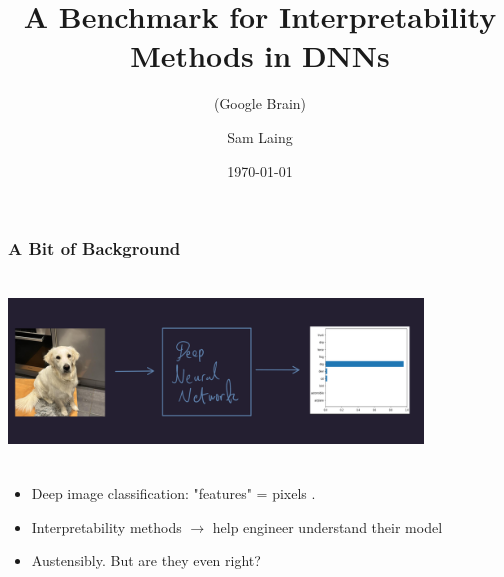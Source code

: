 \documentclass{beamer}
\theoremstyle{mystyle}
\begin{document}
\title{A Benchmark for Interpretability Methods in DNNs}
\subtitle{(Google Brain)}
\author{Sam Laing }
\date{\today}
\begin{frame}
\titlepage
\end{frame}
\begin{frame}
	\frametitle{A Bit of Background}
	\includegraphics[width = 11cm, height = 5cm]{dog_net2.png} \pause
	\begin{itemize}
		\item Deep image classification: "features" = pixels .\pause
		\item Interpretability methods $\to$ help engineer understand their model\pause
		\item Austensibly. But are they even right?
	\end{itemize}
\end{frame}
\end{document}
